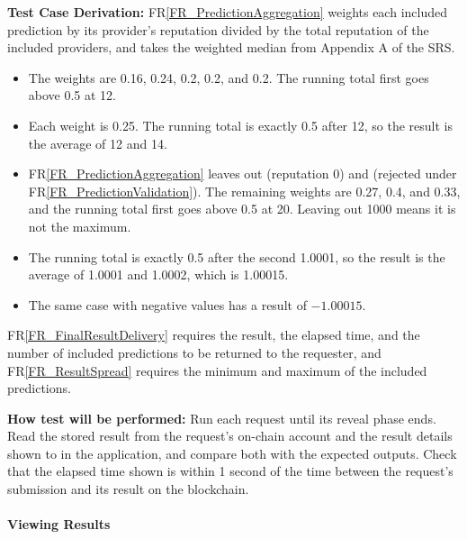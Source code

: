 \documentclass[12pt]{article}
\newcommand{\rref}[1]{FR\ref{#1}}
\newcommand{\fixture}[1]{\texttt{\seqsplit{#1}}}
\begin{document}
\begin{enumerate}
\textbf{Test Case Derivation:} \rref{FR_PredictionAggregation} weights each included prediction by its provider's
reputation divided by the total reputation of the included providers, and takes
the weighted median from Appendix A of the SRS.
\begin{itemize}
\item[1.] The weights are 0.16, 0.24, 0.2, 0.2, and 0.2. The running total first
goes above 0.5 at 12.
\item[2.] Each weight is 0.25. The running total is exactly 0.5 after 12, so the
result is the average of 12 and 14.
\item[3.] \rref{FR_PredictionAggregation} leaves out \fixture{PROV-36} (reputation 0) and \fixture{PROV-34} (rejected under
\rref{FR_PredictionValidation}). The remaining weights are 0.27, 0.4, and 0.33, and the running total
first goes above 0.5 at 20. Leaving out 1000 means it is not the maximum.
\item[4.] The running total is exactly 0.5 after the second 1.0001, so the
result is the average of 1.0001 and 1.0002, which is 1.00015.
\item[5.] The same case with negative values has a result of $-1.00015$.
\end{itemize}
\rref{FR_FinalResultDelivery} requires the result, the elapsed time, and the number of included
predictions to be returned to the requester, and \rref{FR_ResultSpread} requires the minimum and
maximum of the included predictions.

\textbf{How test will be performed:} Run each request until its reveal phase
ends. Read the stored result from the request's on-chain account and the
result details shown to \fixture{RQ-01} in the application, and compare both with the
expected outputs. Check that the elapsed time shown is within 1 second of the
time between the request's submission and its result on the blockchain.

\end{enumerate}

\paragraph{Viewing Results}
\end{document}
